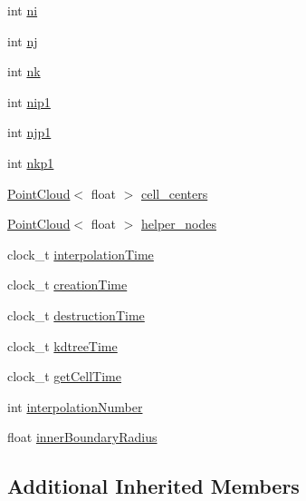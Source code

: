 \begin{DoxyCompactItemize}
\item 
int \hyperlink{classccmc_1_1_l_f_m_interpolator_ad1fdf3218bc64b9dd40a1fdf4166d331}{ni}
\item 
int \hyperlink{classccmc_1_1_l_f_m_interpolator_a5513238abd218dbdd6f42dd851647693}{nj}
\item 
int \hyperlink{classccmc_1_1_l_f_m_interpolator_a5bd5a51d1dc53c2b9b0612ef1b1ab16f}{nk}
\item 
int \hyperlink{classccmc_1_1_l_f_m_interpolator_a74b3697313c8b9f3d4524256bd3f50d2}{nip1}
\item 
int \hyperlink{classccmc_1_1_l_f_m_interpolator_a34f165669a90b3ad8a4c559c959f11d8}{njp1}
\item 
int \hyperlink{classccmc_1_1_l_f_m_interpolator_a4f205cc413dcbb003175d4ac88d353c4}{nkp1}
\item 
\hyperlink{struct_point_cloud}{Point\-Cloud}$<$ float $>$ \hyperlink{classccmc_1_1_l_f_m_interpolator_a1765ca6f750c97c3592ef885ef04e029}{cell\-\_\-centers}
\item 
\hyperlink{struct_point_cloud}{Point\-Cloud}$<$ float $>$ \hyperlink{classccmc_1_1_l_f_m_interpolator_a7738b918ba62723afa8bc49e5400979b}{helper\-\_\-nodes}
\item 
clock\-\_\-t \hyperlink{classccmc_1_1_l_f_m_interpolator_acca12555fdadb1e0970e4bd16351e524}{interpolation\-Time}
\item 
clock\-\_\-t \hyperlink{classccmc_1_1_l_f_m_interpolator_aa885a2e4ded490e33fbc610310f066d8}{creation\-Time}
\item 
clock\-\_\-t \hyperlink{classccmc_1_1_l_f_m_interpolator_a8c53a39101dcc800176cac6aba5ea6bb}{destruction\-Time}
\item 
clock\-\_\-t \hyperlink{classccmc_1_1_l_f_m_interpolator_a403c1241a9e427df78da10b2499fc46f}{kdtree\-Time}
\item 
clock\-\_\-t \hyperlink{classccmc_1_1_l_f_m_interpolator_ac1bf4dd18c18f18347c21673be51ad5d}{get\-Cell\-Time}
\item 
int \hyperlink{classccmc_1_1_l_f_m_interpolator_a4c7b4e25409db6b63c655d2313fa3560}{interpolation\-Number}
\item 
float \hyperlink{classccmc_1_1_l_f_m_interpolator_a4d3fbbf77c796fd53e1e8198dff71b0d}{inner\-Boundary\-Radius}
\end{DoxyCompactItemize}
\subsection*{Additional Inherited Members}


